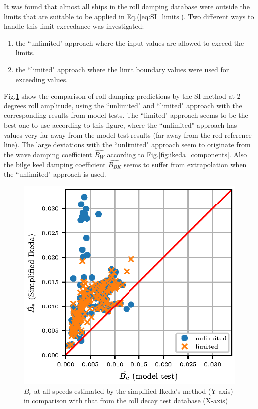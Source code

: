 It was found that almost all ships in the roll damping database were outside the limits that are suitable to be applied in Eq.(\ref{eq:SI_limits}). Two different ways to handle this limit exceedance was investigated:
\begin{enumerate}
  \item the ``unlimited" approach where the input values are allowed to exceed the limits.
  \item the ``limited" approach where the limit boundary values were used for exceeding values.
\end{enumerate}

Fig.\ref{fig:ikeda_limited} show the comparison of roll damping predictions by the SI-method at 2 degrees roll amplitude, using the ``unlimited" and ``limited" approach with the corresponding results from model tests. The ``limited" approach seems to be the best one to use according to this figure, where the ``unlimited" approach has values very far away from the model test results (far away from the red reference line).   
The large deviations with the ``unlimited" approach seem to originate from the wave damping coefficient $\hat{B_W}$ according to Fig.\ref{fig:ikeda_components}. Also the bilge keel damping coefficient $\hat{B_{BK}}$ seems to suffer from extrapolation when the ``unlimited" approach is used. 

\begin{figure}[H]
\vspace{-0.5cm}
\centering
  \centering
  \includegraphics[]{figures/ikeda_limited.eps}
  \vspace{-0.5cm}
  \caption{$\hat{B_e}$ at all speeds estimated by the simplified Ikeda's method (Y-axis) in comparison with that from the roll decay test database (X-axis)}
  \label{fig:ikeda_limited}
\end{figure}


